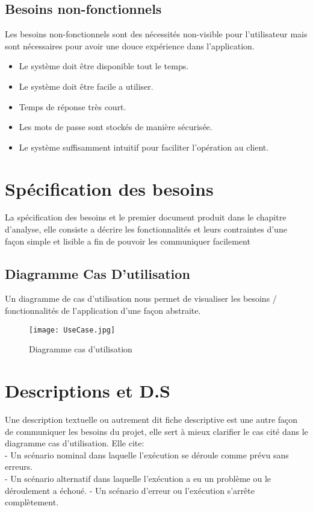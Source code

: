 \subsection{Besoins non-fonctionnels}
Les besoins non-fonctionnels sont des nécessités non-visible pour l'utilisateur mais sont nécessaires pour avoir une douce expérience dans l'application.\\
\begin{itemize}
\item Le système doit être disponible tout le temps.
\item Le système doit être facile a utiliser.
\item Temps de réponse très court.
\item Les mots de passe sont stockés de manière sécurisée.
\item Le système suffisamment intuitif pour faciliter l’opération au client.
\end{itemize}


\pagebreak
\section{Spécification des besoins}
La spécification des besoins et le premier document produit dans le chapitre d'analyse, elle consiste a décrire les fonctionnalités et leurs contraintes d'une façon simple et lisible a fin de pouvoir les communiquer facilement

\subsection{Diagramme Cas D'utilisation}
Un diagramme de cas d'utilisation nous permet de visualiser les besoins / fonctionnalités de l'application d'une façon abstraite.

\begin{figure}[h!]
\centering
\texttt{[image: UseCase.jpg]}
\caption{Diagramme cas d'utilisation}
\label{fig:use case}
\end{figure}


\section{Descriptions et D.S}
Une description textuelle ou autrement dit fiche descriptive est une autre façon de communiquer les besoins du projet, elle sert à mieux clarifier le cas cité dans le diagramme cas d'utilisation.
Elle cite:\\
 - Un scénario nominal dans laquelle l'exécution se déroule comme prévu sans erreurs.\\
 - Un scénario alternatif dans laquelle l'exécution a eu un problème ou le déroulement a échoué.
 - Un scénario d'erreur ou l'exécution s'arrête complètement.
 

